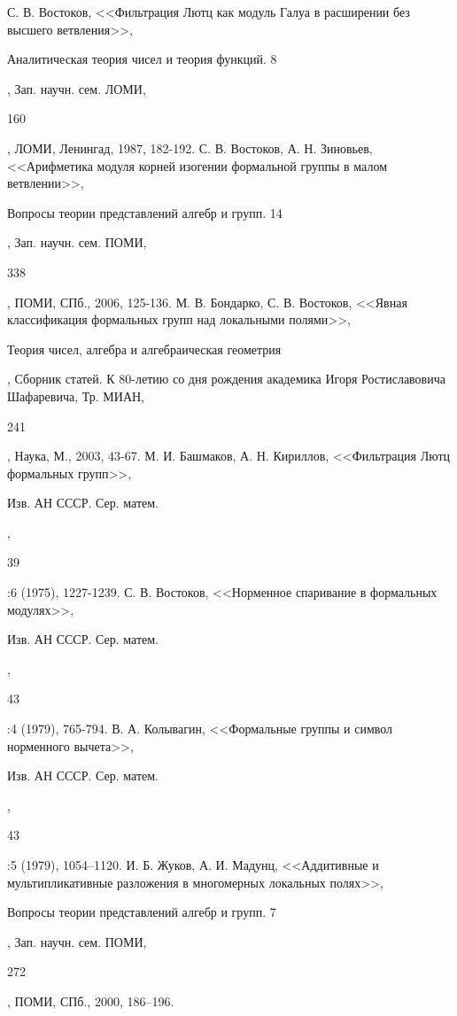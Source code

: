 \documentclass[a4paper]{article}
\begin{document}
\begin{thebibliography}{3}   
    С. В. Востоков, <<Фильтрация Лютц как модуль Галуа в расширении без высшего ветвления>>, \begin{it}Аналитическая теория чисел и теория функций. 8\end{it}, Зап. научн. сем. ЛОМИ, \begin{bf}160\end{bf}, ЛОМИ, Ленингад, 1987, 182-192.           
    С. В. Востоков, А. Н. Зиновьев, <<Арифметика модуля корней изогении формальной группы в малом ветвлении>>, \begin{it}Вопросы теории представлений алгебр и групп. 14\end{it}, Зап. научн. сем. ПОМИ, \begin{bf}338\end{bf}, ПОМИ, СПб., 2006, 125-136.           
    М. В. Бондарко, С. В. Востоков, <<Явная классификация формальных групп над локальными полями>>, \begin{it}Теория чисел, алгебра и алгебраическая геометрия\end{it}, Сборник статей. К 80-летию со дня рождения академика Игоря Ростиславовича Шафаревича, Тр. МИАН, \begin{bf}241\end{bf}, Наука, М., 2003, 43-67.
    М. И. Башмаков, А. Н. Кириллов, <<Фильтрация Лютц формальных групп>>, \begin{it}Изв. АН СССР. Сер. матем.\end{it}, \begin{bf}39\end{bf}:6 (1975), 1227-1239.
    С. В. Востоков, <<Норменное спаривание в формальных модулях>>, \begin{it}Изв. АН СССР. Сер. матем.\end{it}, \begin{bf}43\end{bf}:4 (1979), 765-794.
    В. А. Колывагин, <<Формальные группы и символ норменного вычета>>, \begin{it}Изв. АН СССР. Сер. матем.\end{it}, \begin{bf}43\end{bf}:5 (1979), 1054–1120.
    И. Б. Жуков, А. И. Мадунц, <<Аддитивные и мультипликативные разложения в многомерных локальных полях>>, \begin{it}Вопросы теории представлений алгебр и групп. 7\end{it}, Зап. научн. сем. ПОМИ, \begin{bf}272\end{bf}, ПОМИ, СПб., 2000, 186–196.

\end{thebibliography}  
\end{document}
